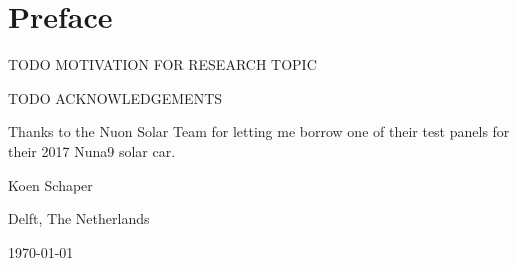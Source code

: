 \chapter*{Preface}
TODO MOTIVATION FOR RESEARCH TOPIC

\vspace{1\baselineskip}

\noindent
TODO ACKNOWLEDGEMENTS

Thanks to the Nuon Solar Team for letting me borrow one of their test panels for their 2017 Nuna9 solar car.

\vspace{1\baselineskip}

\noindent
Koen Schaper

\vspace{1\baselineskip}

\noindent
Delft, The Netherlands

\noindent
\today
